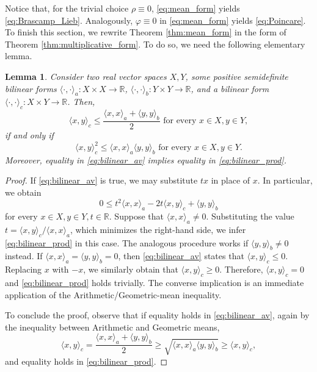 \documentclass[a4paper, 11pt]{article}
\newcommand{\R}{\mathbb{R}}
\newtheorem{lemma}[theorem]{Lemma}
\theoremstyle{definition}
\begin{document}
Notice that, for the trivial choice $\rho\equiv 0$, \eqref{eq:mean_form} yields \eqref{eq:Brascamp_Lieb}. Analogously, $\varphi \equiv 0$ in \eqref{eq:mean_form} yields \eqref{eq:Poincare}. To finish this section, we rewrite Theorem \ref{thm:mean_form} in the form of Theorem \ref{thm:multiplicative_form}. To do so, we need the following elementary lemma.
\begin{lemma}\label{lemma:bilinear}
    Consider two real vector spaces $X, Y$, some positive semidefinite bilinear forms $\langle \cdot,\cdot\rangle_a : X \times X \to \R$, $\langle \cdot,\cdot\rangle_b : Y \times Y \to \R$, and a bilinear form $\langle \cdot,\cdot\rangle_c : X \times Y \to \R$. Then,
    \begin{equation}\label{eq:bilinear_av}
        \langle x, y\rangle_c \leq \frac{\langle x,x\rangle_a+\langle y,y\rangle_b}{2} \text{  for every } x \in X, y \in Y,
    \end{equation}
    if and only if
    \begin{equation}\label{eq:bilinear_prod}
        \langle x, y\rangle^2_c \leq \langle x,x\rangle_a\langle y,y\rangle_b \text{  for every } x \in X, y \in Y.
    \end{equation}
    Moreover, equality in \eqref{eq:bilinear_av} implies equality in \eqref{eq:bilinear_prod}.
\end{lemma}
\begin{proof}
    If \eqref{eq:bilinear_av} is true, we may substitute $tx$ in place of $x$. In particular, we obtain \[ 0\leq t^2\langle x,x\rangle_a- 2t\langle x, y\rangle_c +\langle y,y\rangle_b\] for every $x \in X, y \in Y, t \in \mathbb{R}$. Suppose that $\langle x,x\rangle_a\neq 0$. Substituting the value $t=\langle x,y \rangle_c/\langle x, x\rangle_a$, which minimizes the right-hand side, we infer \eqref{eq:bilinear_prod} in this case. The analogous procedure works if $\langle y,y\rangle_b \neq 0$ instead. If $\langle x,x\rangle_a=\langle y,y\rangle_b=0$, then \eqref{eq:bilinear_av} states that $\langle x, y\rangle_c \leq 0$. Replacing $x$ with $-x$, we similarly obtain that $\langle x, y\rangle_c \geq 0$. Therefore, $\langle x, y\rangle_c = 0$ and \eqref{eq:bilinear_prod} holds trivially. The converse implication is an immediate application of the Arithmetic/Geometric-mean inequality.

    To conclude the proof, observe that if equality holds in \eqref{eq:bilinear_av}, again by the inequality between Arithmetic and Geometric means, 
    \[ \langle x, y \rangle_c = \frac{\langle x,x\rangle_a+\langle y,y\rangle_b}{2} \geq \sqrt{\langle x,x\rangle_a\langle y,y\rangle_b}  \geq \langle x, y \rangle_c, \] and equality holds in \eqref{eq:bilinear_prod}.
\end{proof}\noindent
\end{document}
